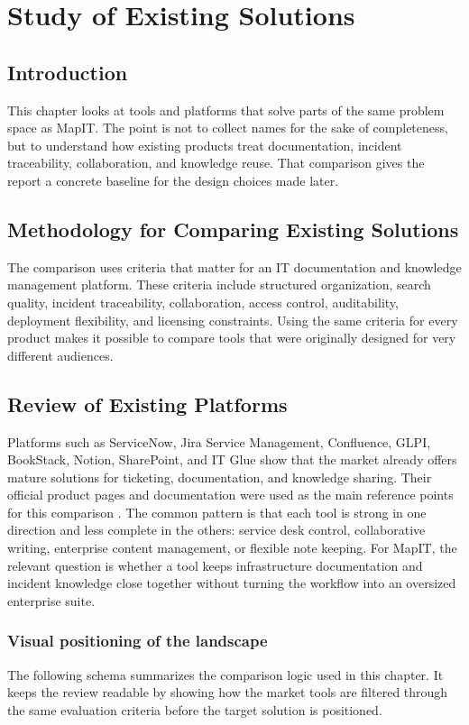 \chapter{Study of Existing Solutions}

\section{Introduction}
This chapter looks at tools and platforms that solve parts of the same problem space as MapIT. The point is not to collect names for the sake of completeness, but to understand how existing products treat documentation, incident traceability, collaboration, and knowledge reuse. That comparison gives the report a concrete baseline for the design choices made later.

\section{Methodology for Comparing Existing Solutions}
The comparison uses criteria that matter for an IT documentation and knowledge management platform. These criteria include structured organization, search quality, incident traceability, collaboration, access control, auditability, deployment flexibility, and licensing constraints. Using the same criteria for every product makes it possible to compare tools that were originally designed for very different audiences.

\section{Review of Existing Platforms}
Platforms such as ServiceNow, Jira Service Management, Confluence, GLPI, BookStack, Notion, SharePoint, and IT Glue show that the market already offers mature solutions for ticketing, documentation, and knowledge sharing. Their official product pages and documentation were used as the main reference points for this comparison \cite{servicenow_itsm,jira_service_management,confluence_docs,glpi,bookstack,notion,sharepoint,itglue}. The common pattern is that each tool is strong in one direction and less complete in the others: service desk control, collaborative writing, enterprise content management, or flexible note keeping. For MapIT, the relevant question is whether a tool keeps infrastructure documentation and incident knowledge close together without turning the workflow into an oversized enterprise suite.

\subsection{Visual positioning of the landscape}
The following schema summarizes the comparison logic used in this chapter. It keeps the review readable by showing how the market tools are filtered through the same evaluation criteria before the target solution is positioned.

